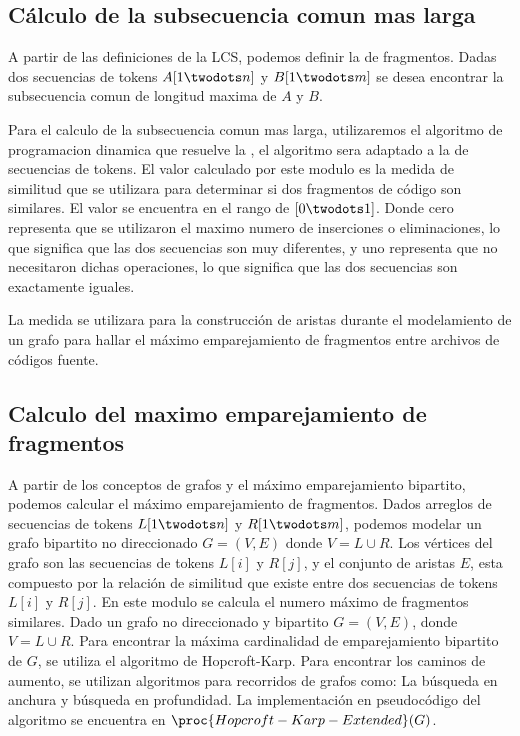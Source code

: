 %


\subsection{Cálculo de la subsecuencia comun mas larga}
A partir de las definiciones de la LCS, podemos definir la  de fragmentos. Dadas dos secuencias de tokens $A[1 \twodots n]$ y $B[1 \twodots m]$ se desea encontrar la subsecuencia comun de longitud maxima de $A$ y $B$.

Para el calculo de la subsecuencia comun mas larga, utilizaremos el algoritmo de programacion dinamica que resuelve la , el algoritmo sera adaptado a la  de secuencias de tokens. El valor calculado por este modulo es la medida de similitud que se utilizara para determinar si dos fragmentos de código son similares. El valor se encuentra en el rango de $[0 \twodots 1]$. Donde cero representa que se utilizaron el maximo numero de inserciones o eliminaciones, lo que significa que las dos secuencias son muy diferentes, y uno representa que no necesitaron dichas operaciones, lo que significa que las dos secuencias son exactamente iguales.

La medida se utilizara para la construcción de aristas durante el modelamiento de un grafo para hallar el máximo emparejamiento de fragmentos entre archivos de códigos fuente.



\subsection{Calculo del maximo emparejamiento de fragmentos}
A partir de los conceptos de grafos y el máximo emparejamiento bipartito, podemos calcular el máximo emparejamiento de fragmentos. Dados arreglos de secuencias de tokens $L[1 \twodots n]$ y $R[1 \twodots m]$, podemos modelar un grafo bipartito no direccionado $G=(V,E)$ donde $V=L \cup R$. Los vértices del grafo son las secuencias de tokens $L[i]$ y $R[j]$, y el conjunto de aristas $E$, esta compuesto por la relación de similitud que existe entre dos secuencias de tokens $L[i]$ y $R[j]$. En este modulo se calcula el numero máximo de fragmentos similares. Dado un grafo no direccionado y bipartito $G=(V,E)$, donde $V=L \cup R$. Para encontrar la máxima cardinalidad de emparejamiento bipartito de $G$, se utiliza el algoritmo de Hopcroft-Karp. Para encontrar los caminos de aumento, se utilizan algoritmos para recorridos de grafos como: La búsqueda en anchura y búsqueda en profundidad.  La implementación en pseudocódigo del algoritmo se encuentra en $\proc{Hopcroft-Karp-Extended}(G)$.

